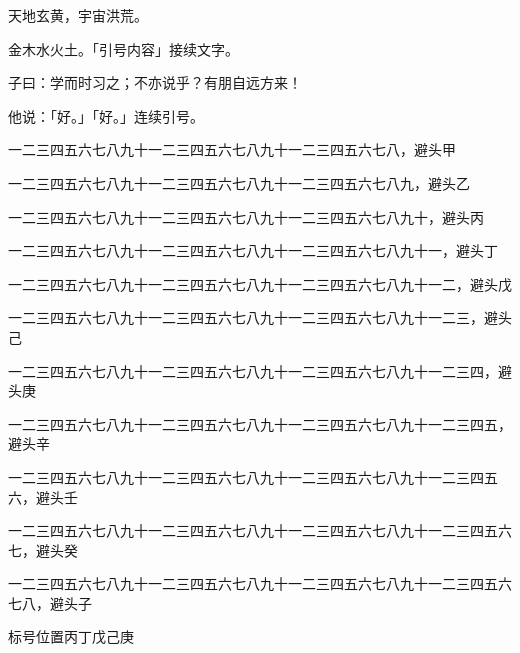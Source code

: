 \documentclass{ltc-cn-vbook}
\begin{document}
\begin{正文}
天地玄黄，宇宙洪荒。

金木水火土。「引号内容」接续文字。

子曰：学而时习之；不亦说乎？有朋自远方来！

他说：「好。」「好。」连续引号。

一二三四五六七八九十一二三四五六七八九十一二三四五六七八，避头甲

一二三四五六七八九十一二三四五六七八九十一二三四五六七八九，避头乙

一二三四五六七八九十一二三四五六七八九十一二三四五六七八九十，避头丙

一二三四五六七八九十一二三四五六七八九十一二三四五六七八九十一，避头丁

一二三四五六七八九十一二三四五六七八九十一二三四五六七八九十一二，避头戊

一二三四五六七八九十一二三四五六七八九十一二三四五六七八九十一二三，避头己

一二三四五六七八九十一二三四五六七八九十一二三四五六七八九十一二三四，避头庚

一二三四五六七八九十一二三四五六七八九十一二三四五六七八九十一二三四五，避头辛

一二三四五六七八九十一二三四五六七八九十一二三四五六七八九十一二三四五六，避头壬

一二三四五六七八九十一二三四五六七八九十一二三四五六七八九十一二三四五六七，避头癸

一二三四五六七八九十一二三四五六七八九十一二三四五六七八九十一二三四五六七八，避头子

标号位置丙丁戊己庚

\end{正文}
\end{document}
